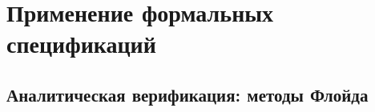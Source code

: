 \documentclass[14pt, twoside]{extreport}
\newcounter{problem_type}[chapter]
\newcounter{zadacha}[problem_type]
\newcommand{\z}{\vspace{0.5cm}\par\addtocounter{zadacha}{1}%
\textit{\arabic{chapter}.\arabic{problem_type}.\arabic{zadacha}}~~  }
\newcommand{\head}[1]{\vspace{1cm}\subsubsection*{#1}}
\newcommand{\zhead}[1]{\head{#1} \refstepcounter{problem_type}}
\begin{document}
\chapter{Применение формальных спецификаций}

%
%
%
%
%
%
%
%

\section{Аналитическая верификация: методы Флойда}
\end{document}
